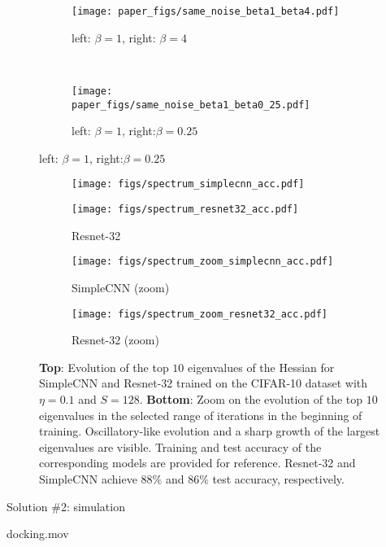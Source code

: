 
\begin{figure}
\centering
\begin{subfigure}[t]{0.45\textwidth}
  \centering
    \texttt{[image: paper\_figs/same\_noise\_beta1\_beta4.pdf]}
  \caption{{\tiny{left: $\beta=1$, right: $\beta=4$}}}
\end{subfigure}
~
\begin{subfigure}[t]{0.45\textwidth}
  \centering
 \texttt{[image: paper\_figs/same\_noise\_beta1\_beta0\_25.pdf]}
    \caption{{\tiny{left: $\beta=1$, right:$\beta=0.25$}}}
\end{subfigure}
\label{fig:same_noise_diff_bp}
\end{figure}


\begin{figure}
\centering
\begin{subfigure}[t]{0.49\linewidth}
\texttt{[image: figs/spectrum\_simplecnn\_acc.pdf]}
\end{subfigure}%
\begin{subfigure}[t]{0.49\linewidth}
\texttt{[image: figs/spectrum\_resnet32\_acc.pdf]}
\caption{Resnet-32}
\end{subfigure}
\begin{subfigure}[t]{0.49\linewidth}
\texttt{[image: figs/spectrum\_zoom\_simplecnn\_acc.pdf]}
 \caption{SimpleCNN (zoom)}
\end{subfigure}%
\begin{subfigure}[t]{0.49\linewidth}
\texttt{[image: figs/spectrum\_zoom\_resnet32\_acc.pdf]}
\caption{Resnet-32 (zoom)}
\end{subfigure}
\caption{\textbf{Top}: Evolution of the top $10$ eigenvalues of the Hessian for SimpleCNN and Resnet-32 trained on the CIFAR-10 dataset with $\eta=0.1$ and $S=128$. \textbf{Bottom}: Zoom on the evolution of the top $10$ eigenvalues in the selected range of iterations in the beginning of training. Oscillatory-like evolution and a sharp growth of the largest eigenvalues are visible. Training and test accuracy of the corresponding models are provided for reference. Resnet-32  and SimpleCNN achieve $88\%$ and $86\%$ test accuracy, respectively.}
\label{fig:largesteigenvalues}
\end{figure}

\begin{frame}{Solution \#2: simulation}
\LARGE
\begin{center}
            {docking.mov}
            
            
            \end{center}
\end{frame}